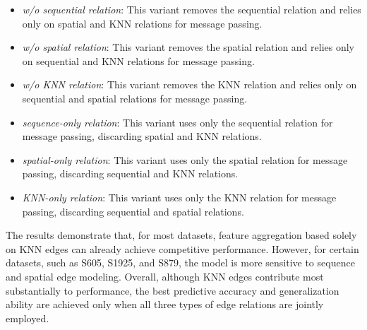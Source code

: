 \documentclass[journal,twoside,web]{ieeecolor}
\begin{document}
\begin{itemize}
\item \textit{w/o sequential relation}: This variant removes the sequential relation and relies only on spatial and KNN relations for message passing.
\item \textit{w/o spatial relation}: This variant removes the spatial relation and relies only on sequential and KNN relations for message passing.
\item \textit{w/o KNN relation}: This variant removes the KNN relation and relies only on sequential and spatial relations for message passing.
\item \textit{sequence-only relation}: This variant uses only the sequential relation for message passing, discarding spatial and KNN relations.
\item \textit{spatial-only relation}: This variant uses only the spatial relation for message passing, discarding sequential and KNN relations.
\item \textit{KNN-only relation}: This variant uses only the KNN relation for message passing, discarding sequential and spatial relations.
\end{itemize}

The results demonstrate that, for most datasets, feature aggregation based solely on KNN edges can already achieve competitive performance. However, for certain datasets, such as S605, S1925, and S879, the model is more sensitive to sequence and spatial edge modeling. Overall, although KNN edges contribute most substantially to performance, the best predictive accuracy and generalization ability are achieved only when all three types of edge relations are jointly employed.
\end{document}
